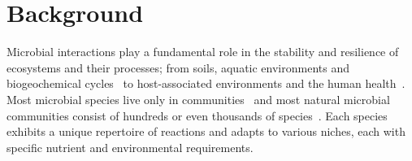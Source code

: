 \documentclass[sn-mathphys,Numbered]{sn-jnl}  %
\theoremstyle{thmstyleone}%
\theoremstyle{thmstyletwo}%
\theoremstyle{thmstylethree}%
\begin{document}
\section*{Background}
\label{sec:background}


    Microbial interactions play a fundamental role in the stability and resilience of ecosystems and their processes; from soils, aquatic environments and biogeochemical cycles~\cite{yuan2021climate} to host-associated environments and the human health~\cite{raes2008molecular, faust2012microbialReviewInteractions}.
    Most microbial species live only in communities~\cite{rottjers2018hairballs} and most natural microbial communities consist of hundreds or even thousands of species~\cite{balint2016millions}.
    Each species exhibits a unique repertoire of reactions and adapts to various niches, each with specific nutrient and environmental requirements.
 
\end{document}
